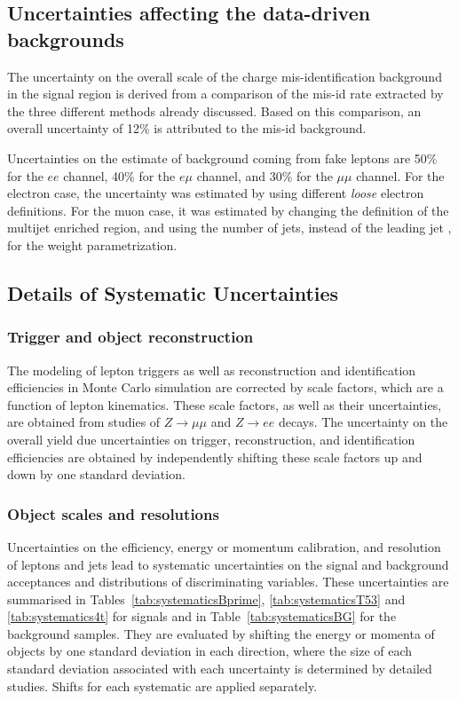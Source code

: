 \subsection{Uncertainties affecting the data-driven backgrounds}

The uncertainty on the overall scale of the charge mis-identification background in the signal region is derived from a comparison of the mis-id rate extracted by the three different methods already
discussed. 
Based on this comparison, an overall uncertainty of 12\% is attributed to the mis-id background.

Uncertainties on the estimate of background coming from fake leptons are 50\% for the $ee$ channel, 40\% for the $e\mu$ channel, and 30\% for the $\mu\mu$ channel.
For the electron case, the uncertainty was estimated by using different {\it loose} electron definitions. For the muon case, it was estimated by changing the definition of the multijet enriched region, and using the number of jets, instead of the leading jet \pT{}, for the weight parametrization.






\subsection{Details of Systematic Uncertainties}


\subsubsection{Trigger and object reconstruction}
The modeling of lepton triggers as well as reconstruction and identification efficiencies in
Monte Carlo simulation are corrected by scale factors, which are a function of lepton kinematics.
These scale factors, as well as their uncertainties, are obtained from studies of $Z \rightarrow \mu \mu$ and $Z \rightarrow e e$ decays.
The uncertainty on the overall yield due uncertainties on trigger, reconstruction, and identification efficiencies 
are obtained by independently shifting these scale factors up and down by one standard deviation.

\subsubsection{Object scales and resolutions}
Uncertainties on the efficiency, energy or momentum calibration, and resolution of leptons and jets 
lead to systematic uncertainties on the signal and background acceptances and distributions of discriminating variables.
These uncertainties are summarised in Tables~\ref{tab:systematicsBprime}, \ref{tab:systematicsT53} and
\ref{tab:systematics4t} for signals and in Table~\ref{tab:systematicsBG} for the background samples.
They are evaluated by shifting the energy or momenta of objects by one standard deviation in each direction, 
where the size of each standard deviation associated with each uncertainty is determined by detailed studies.
Shifts for each systematic are applied separately.

